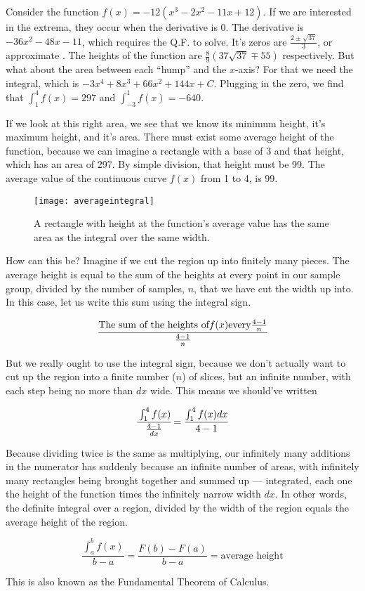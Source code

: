 Consider the function $f(x)=-12(x^3-2x^2-11x+12)$.  If we are interested in the extrema, they 
occur when the derivative is 0.  The derivative is $-36x^2-48x-11$, which requires the Q.F. to
solve.  It's zeros are $\frac{2\pm\sqrt{37}}{3}$, or approximate .  The heights of the function
are $\frac{8}{9}(37\sqrt{37}\mp55)$ respectively.  But what about the area between each 
``hump'' and the $x$-axis?  For that we need the integral, which is $-3x^4+8x^3+66x^2+144x+C$.
Plugging in the zero, we find that $\int_1^4 f(x) = 297$ and $\int_{-3}^1 f(x) = -640$.

If we look at this right area, we see that we know its minimum height, it's maximum height, and
it's area.  There must exist some average height of the function, because we can imagine a rectangle
with a base of 3 and that height, which has an area of 297.  By simple division, that height must be
99.  The average value of the continuous curve $f(x)$ from 1 to 4, is 99.


\begin{figure}[h]
\begin{centering}
\texttt{[image: averageintegral]}
\caption[Integrals and Averages]{A rectangle with height at the function's average value has the same area as the integral over the same width.}
\end{centering}
\end{figure}

How can this be?  Imagine if we cut the region up into finitely many pieces.  The average height
is equal to the sum of the heights at every point in our sample group, divided by the number of
samples, $n$, that we have cut the width up into.  
In this case, let us write this sum using the integral sign.

$$
\cfrac{\text{The sum of the heights of} f(x) \text{every} \frac{4-1}{n}}{\frac{4-1}{n}}
$$

But we really ought to use the integral sign, because we don't actually want to cut up the region into
a finite number ($n$) of slices, but an infinite number, with each step being no more than $dx$ wide.
This means we should've written

$$
\cfrac{\int_1^4 f(x)}{\frac{4-1}{dx}} = \frac{\int_1^4 f(x)dx}{4-1}
$$

Because dividing twice is the same as multiplying, our infinitely many additions in the numerator
has suddenly because an infinite number of areas, with infinitely many rectangles being brought
together and summed up --- integrated, each one the height of the function times the infinitely
narrow width $dx$.  In other words, the definite integral over a region, divided by the width of
the region equals the average height of the region.

$$
\frac{\int_a^b f(x)}{b-a} = \frac{F(b)-F(a)}{b-a} = \text{average height}
$$

This is also known as the Fundamental Theorem of Calculus.